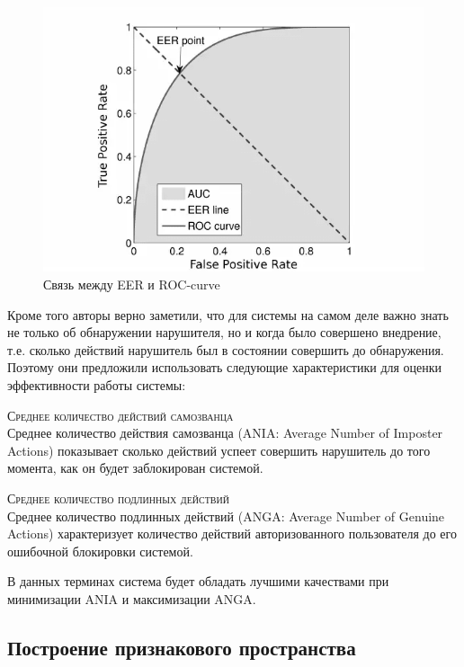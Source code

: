 \documentclass[12pt]{article}
\begin{document}
    \begin{figure}[hb]
        \centering
        \includegraphics[width=0.75\linewidth]{EER_ROC.png}
        \caption{Связь между EER и ROC-curve}
        \label{sec:Overview:Metrics:fig:EER_ROC}
    \end{figure}

    \par Кроме того авторы \cite{Mondal} верно заметили, что для системы на самом деле важно знать не только об обнаружении нарушителя, но и когда было совершено внедрение, т.е. сколько действий нарушитель был в состоянии совершить до обнаружения. Поэтому они предложили использовать следующие характеристики для оценки эффективности работы системы: \\

    \par \textsc{Среднее количество действий самозванца} \\
    Среднее количество действия самозванца (ANIA: Average Number of Imposter Actions) показывает сколько действий успеет совершить нарушитель до того момента, как он будет заблокирован системой. \\

    \par \textsc{Среднее количество подлинных действий} \\
    Среднее количество подлинных действий (ANGA: Average Number of Genuine Actions) характеризует количество действий авторизованного пользователя до его ошибочной блокировки системой. \\

    \par В данных терминах система будет обладать лучшими качествами при минимизации ANIA и максимизации ANGA.


    \subsection{Построение признакового пространства}
    \label{sec:Overview:Features}
\end{document}
